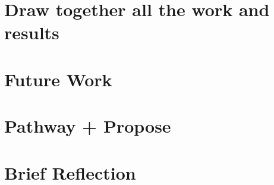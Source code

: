  \section{Draw together all the work and results}
 
 \section{Future Work}
 
\section{Pathway + Propose}
 
 
\section{Brief Reﬂection}